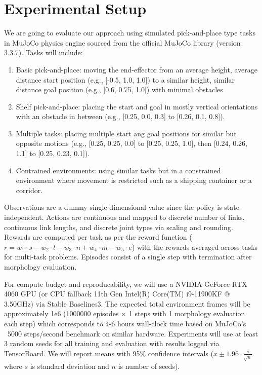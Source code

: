 \documentclass[conference]{IEEEtran}
\begin{document}
\section{Experimental Setup}
We are going to evaluate our approach using simulated pick-and-place type tasks in MuJoCo physics engine sourced from the official MuJoCo library (version 3.3.7).
Tasks will include:
\begin{enumerate}
    \item Basic pick-and-place: moving the end-effector from an average height, average distance start position (e.g., [-0.5, 1.0, 1.0]) to a similar height, similar distance goal position (e.g., [0.6, 0.75, 1.0]) with minimal obstacles
    \item Shelf pick-and-place: placing the start and goal in mostly vertical orientations with an obstacle in between (e.g., [0.25, 0.0, 0.3] to [0.26, 0.1, 0.8]).
    \item Multiple tasks: placing multiple start ang goal positions for similar but opposite motions (e.g., [0.25, 0.25, 0.0] to [0.25, 0.25, 1.0], then [0.24, 0.26, 1.1] to [0.25, 0.23, 0.1]).
    \item Contrained environments: using similar tasks but in a constrained environment where movement is restricted such as a shipping container or a corridor.
\end{enumerate}

Observations are a dummy single-dimensional value since the policy is state-independent.
Actions are continuous and mapped to discrete number of links, continuous link lengths, and discrete joint types via scaling and rounding.
Rewards are computed per task as per the reward function ($r = w_1 \cdot s - w_2 \cdot l - w_3 \cdot n + w_4 \cdot m - w_5 \cdot e$) with the rewards averaged across tasks for multi-task problems.
Episodes consist of a single step with termination after morphology evaluation.

For compute budget and reproducability, we will use a NVIDIA GeForce RTX 4060 GPU (or CPU fallback 11th Gen Intel(R) Core(TM) i9-11900KF @ 3.50GHz) via Stable Baselines3.
The expected total environment frames will be approximately 1e6 (1000000 episodes $\times$ 1 steps with 1 morphology evaluation each step) which corresponds to 4-6 hours wall-clock time based on MuJoCo's ~5000 steps/second benchmark on similar hardware.
Experiments will use at least 3 random seeds for all training and evaluation with results logged via TensorBoard.
We will report means with 95\% confidence intervals ($\bar{x} \pm 1.96 \cdot \frac{s}{\sqrt{n}}$ where $s$ is standard deviation and $n$ is number of seeds). 
\end{document}
